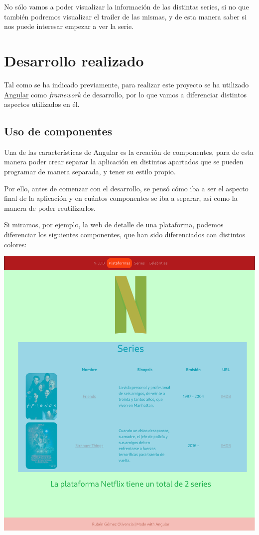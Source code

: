 \documentclass{\ClassPath/viu-tfm-template}
\begin{document}
No sólo vamos a poder visualizar la información de las distintas series, si no que también podremos visualizar el trailer de las mismas, y de esta manera saber si nos puede interesar empezar a ver la serie.

\chapter{Desarrollo realizado}
Tal como se ha indicado previamente, para realizar este proyecto se ha utilizado \href{https://angular.io/}{Angular} como \textit{framework} de desarrollo, por lo que vamos a diferenciar distintos aspectos utilizados en él.

\section{Uso de componentes}
Una de las características de Angular es la creación de componentes, para de esta manera poder crear separar la aplicación en distintos apartados que se pueden programar de manera separada, y tener su estilo propio.

Por ello, antes de comenzar con el desarrollo, se pensó cómo iba a ser el aspecto final de la aplicación y en cuántos componentes se iba a separar, así como la manera de poder reutilizarlos.

Si miramos, por ejemplo, la web de detalle de una plataforma, podemos diferenciar los siguientes componentes, que han sido diferenciados con distintos colores:

\vspace{-1em}
\begin{center}
    \includegraphics[frame,width=0.6\linewidth]{img/componentes.png}
\end{center}
\end{document}
